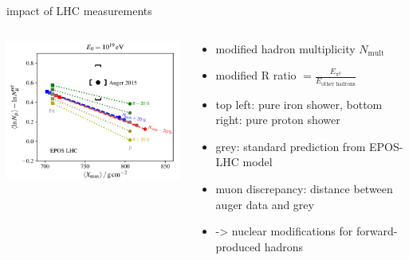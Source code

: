 \documentclass[aspectratio=1610, 9pt]{beamer}
\begin{document}
\begin{frame}{impact of LHC measurements}
  \begin{columns}
    \begin{column}[c]{0.48\textwidth}
      \includegraphics{plots/x_max_impact.png}
    \end{column}
    \begin{column}[c]{0.48\textwidth}
      \begin{itemize}
        \item modified hadron multiplicity $N_\text{mult}$
        \item modified R ratio $= \frac{E_{\pi^0}}{E_\text{other hadrons}}$
        \item top left: pure iron shower, bottom right: pure proton shower
        \item grey: standard prediction from EPOS-LHC model
        \item muon discrepancy: distance between auger data and grey
        \item -> nuclear modifications for forward-produced hadrons
      \end{itemize}
    \end{column}
  \end{columns}
\end{frame}
\end{document}
